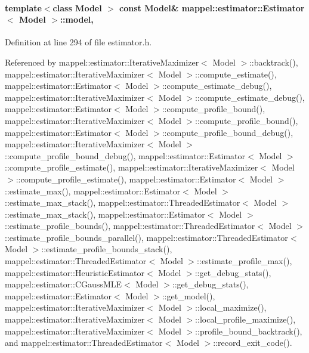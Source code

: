 \paragraph[{\texorpdfstring{model}{model}}]{\setlength{\rightskip}{0pt plus 5cm}template$<$class Model $>$ const Model\& {\bf mappel\+::estimator\+::\+Estimator}$<$ Model $>$\+::model\hspace{0.3cm}{\ttfamily [protected]}, {\ttfamily [inherited]}}\hypertarget{classmappel_1_1estimator_1_1Estimator_a2f157410771fb79a20d4d54e505750d0}{}\label{classmappel_1_1estimator_1_1Estimator_a2f157410771fb79a20d4d54e505750d0}


Definition at line 294 of file estimator.\+h.



Referenced by mappel\+::estimator\+::\+Iterative\+Maximizer$<$ Model $>$\+::backtrack(), mappel\+::estimator\+::\+Iterative\+Maximizer$<$ Model $>$\+::compute\+\_\+estimate(), mappel\+::estimator\+::\+Estimator$<$ Model $>$\+::compute\+\_\+estimate\+\_\+debug(), mappel\+::estimator\+::\+Iterative\+Maximizer$<$ Model $>$\+::compute\+\_\+estimate\+\_\+debug(), mappel\+::estimator\+::\+Estimator$<$ Model $>$\+::compute\+\_\+profile\+\_\+bound(), mappel\+::estimator\+::\+Iterative\+Maximizer$<$ Model $>$\+::compute\+\_\+profile\+\_\+bound(), mappel\+::estimator\+::\+Estimator$<$ Model $>$\+::compute\+\_\+profile\+\_\+bound\+\_\+debug(), mappel\+::estimator\+::\+Iterative\+Maximizer$<$ Model $>$\+::compute\+\_\+profile\+\_\+bound\+\_\+debug(), mappel\+::estimator\+::\+Estimator$<$ Model $>$\+::compute\+\_\+profile\+\_\+estimate(), mappel\+::estimator\+::\+Iterative\+Maximizer$<$ Model $>$\+::compute\+\_\+profile\+\_\+estimate(), mappel\+::estimator\+::\+Estimator$<$ Model $>$\+::estimate\+\_\+max(), mappel\+::estimator\+::\+Estimator$<$ Model $>$\+::estimate\+\_\+max\+\_\+stack(), mappel\+::estimator\+::\+Threaded\+Estimator$<$ Model $>$\+::estimate\+\_\+max\+\_\+stack(), mappel\+::estimator\+::\+Estimator$<$ Model $>$\+::estimate\+\_\+profile\+\_\+bounds(), mappel\+::estimator\+::\+Threaded\+Estimator$<$ Model $>$\+::estimate\+\_\+profile\+\_\+bounds\+\_\+parallel(), mappel\+::estimator\+::\+Threaded\+Estimator$<$ Model $>$\+::estimate\+\_\+profile\+\_\+bounds\+\_\+stack(), mappel\+::estimator\+::\+Threaded\+Estimator$<$ Model $>$\+::estimate\+\_\+profile\+\_\+max(), mappel\+::estimator\+::\+Heuristic\+Estimator$<$ Model $>$\+::get\+\_\+debug\+\_\+stats(), mappel\+::estimator\+::\+C\+Gauss\+M\+L\+E$<$ Model $>$\+::get\+\_\+debug\+\_\+stats(), mappel\+::estimator\+::\+Estimator$<$ Model $>$\+::get\+\_\+model(), mappel\+::estimator\+::\+Iterative\+Maximizer$<$ Model $>$\+::local\+\_\+maximize(), mappel\+::estimator\+::\+Iterative\+Maximizer$<$ Model $>$\+::local\+\_\+profile\+\_\+maximize(), mappel\+::estimator\+::\+Iterative\+Maximizer$<$ Model $>$\+::profile\+\_\+bound\+\_\+backtrack(), and mappel\+::estimator\+::\+Threaded\+Estimator$<$ Model $>$\+::record\+\_\+exit\+\_\+code().

